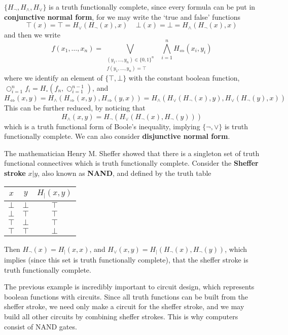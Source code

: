 \begin{example}
    $\{ H_\neg, H_\wedge, H_\vee \}$ is a truth functionally complete, since every formula can be put in {\bf conjunctive normal form}, for we may write the `true and false' functions
    \[ \top(x) = \top = H_\vee(H_\neg(x), x)\ \ \ \ \ \bot(x) = \bot = H_\wedge(H_\neg(x), x) \]
    and then we write
    \[ f(x_1, \dots, x_n) = \bigvee_{\substack{(y_1, \dots, y_n) \in \{ 0, 1 \}^n\\f(y_1, \dots, y_n) = \top}}\ \  \bigwedge_{i = 1}^n H_\Leftrightarrow(x_i, y_i) \]
    where we identify an element of $\{ \top, \bot \}$ with the constant boolean function, $\bigcirc_{i = 1}^n f_i = H_\circ(f_n, \bigcirc_{i = 1}^{n-1})$, and
    \[ H_\Leftrightarrow(x,y) = H_\wedge(H_\Rightarrow(x,y), H_\Rightarrow(y,x)) = H_\wedge(H_\vee(H_\neg(x), y), H_\vee(H_\neg(y), x)) \]
    This can be further reduced, by noticing that
    \[ H_\wedge(x,y) = H_\neg(H_\vee(H_\neg(x), H_\neg(y))) \]
    which is a truth functional form of Boole's inequality, implying $\{ \neg, \vee \}$ is truth functionally complete. We can also consider {\bf disjunctive normal form}.
\end{example}

\begin{example}
    The mathematician Henry M. Sheffer showed that there is a singleton set of truth functional connectives which is truth functionally complete. Consider the {\bf Sheffer stroke} $x|y$, also known as {\bf NAND}, and defined by the truth table
    \begin{center}
    \begin{tabular}{| c | c | c |}
        \hline $x$ & $y$ & $H_|(x,y)$\\
        \hline $\bot$ & $\bot$ & $\top$\\
        $\bot$ & $\top$ & $\top$\\
        $\top$ & $\bot$ & $\top$\\
        $\top$ & $\top$ & $\bot$\\
        \hline
    \end{tabular}
    \end{center}
    Then $H_\neg(x) = H_|(x,x)$, and $H_\vee(x,y) = H_|(H_\neg(x), H_\neg(y))$, which implies (since this set is truth functionally complete), that the sheffer stroke is truth functionally complete.
\end{example}

The previous example is incredibly important to circuit design, which represents boolean functions with circuits. Since all truth functions can be built from the sheffer stroke, we need only make a circuit for the sheffer stroke, and we may build all other circuits by combining sheffer strokes. This is why computers consist of NAND gates.




